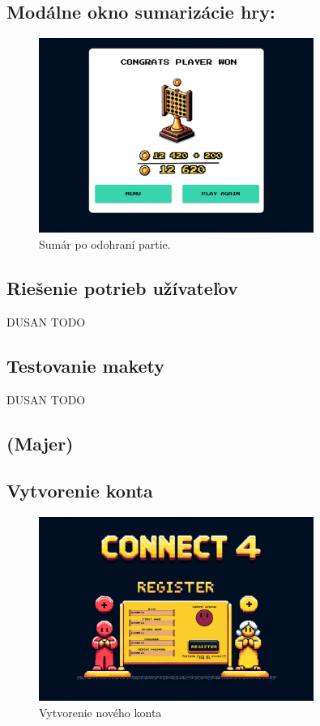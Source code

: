 \documentclass[a4paper, 11pt, onecolumn]{article}
\begin{document}
\subsection*{Modálne okno sumarizácie hry:}
\begin{figure}[H]
  \centering
  \includegraphics[width=0.8\textwidth]{Vyhra.png}
  \caption{ Sumár po odohraní partie.}
  \label{fig:sumár_label}
\end{figure}
\subsection*{Riešenie potrieb užívateľov}
DUSAN TODO
\subsection*{Testovanie makety}
DUSAN TODO


\subsection{(Majer)}
\subsection*{Vytvorenie konta}
\begin{figure}[H]
  \centering
  \includegraphics[width=0.8\textwidth]{Register.png}
  \caption{Vytvorenie nového konta}
  \label{fig:register}
\end{figure}
\end{document}

